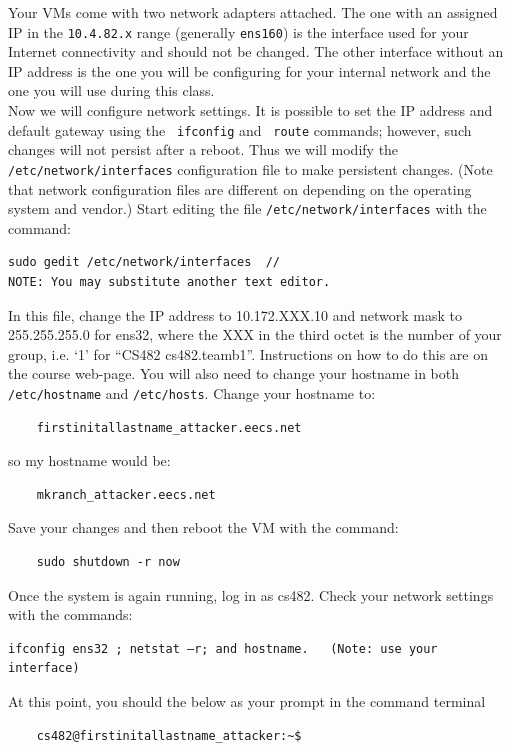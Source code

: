 \documentclass{article}
\begin{document}
Your VMs come with two network adapters attached. The one with an assigned IP in the {\tt 10.4.82.x} range (generally {\tt ens160}) is the interface used for your Internet connectivity and should not be changed. The other interface without an IP address is the one you will be configuring for your internal network and the one you will use during this class.\\
Now we will configure network settings. It is possible to set the IP address and default gateway using the {\tt
ifconfig} and {\tt
route} commands; however, such changes will not persist after a reboot. Thus we will modify the {\tt /etc/network/interfaces} configuration file to make persistent changes. (Note that network configuration files are different on depending on the operating system and vendor.)  Start editing the file {\tt /etc/network/interfaces} with the command:\medskip
\begin{verbatim}
sudo gedit /etc/network/interfaces	//
NOTE: You may substitute another text editor.
\end{verbatim}

In this file, change the IP address to 10.172.XXX.10 and network mask to 255.255.255.0 for ens32, where the XXX in the third octet is the number of your group, i.e. `1' for ``CS482 cs482.teamb1''. Instructions on how to do this are on the course web-page. You will also need to change your hostname in both {\tt /etc/hostname} and {\tt /etc/hosts}. Change your hostname to:
\begin{verbatim}
	firstinitallastname_attacker.eecs.net
\end{verbatim}

so my hostname would be:
\begin{verbatim}
	mkranch_attacker.eecs.net
\end{verbatim}


Save your changes and then reboot the VM with the command:
\begin{verbatim}
	sudo shutdown -r now
\end{verbatim}
Once the system is again running, log in as cs482. Check your network settings with the commands:
\begin{verbatim}
ifconfig ens32 ; netstat –r; and hostname.   (Note: use your interface)
\end{verbatim}
At this point, you should the below as your prompt in the command terminal 
\begin{verbatim}
    cs482@firstinitallastname_attacker:~$
\end{verbatim}
\end{document}
